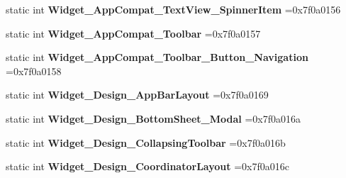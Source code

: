 \begin{DoxyCompactItemize}
\mbox{\label{classandroid_1_1support_1_1v7_1_1mediarouter_1_1R_1_1style_a760aa3fe92fab42e2c86dbb6703d8f70}} 
static int {\bfseries Widget\+\_\+\+App\+Compat\+\_\+\+Text\+View\+\_\+\+Spinner\+Item} =0x7f0a0156
\item 
\mbox{\label{classandroid_1_1support_1_1v7_1_1mediarouter_1_1R_1_1style_a77bfbfd8c74433fb8f81e9f8d7689d45}} 
static int {\bfseries Widget\+\_\+\+App\+Compat\+\_\+\+Toolbar} =0x7f0a0157
\item 
\mbox{\label{classandroid_1_1support_1_1v7_1_1mediarouter_1_1R_1_1style_ae57ab8ce7695ddef42e1ef2bc4b65c98}} 
static int {\bfseries Widget\+\_\+\+App\+Compat\+\_\+\+Toolbar\+\_\+\+Button\+\_\+\+Navigation} =0x7f0a0158
\item 
\mbox{\label{classandroid_1_1support_1_1v7_1_1mediarouter_1_1R_1_1style_a43d74f8165300ac78433e8a7fc3f5279}} 
static int {\bfseries Widget\+\_\+\+Design\+\_\+\+App\+Bar\+Layout} =0x7f0a0169
\item 
\mbox{\label{classandroid_1_1support_1_1v7_1_1mediarouter_1_1R_1_1style_ae1febea129e8f0acc5144138a6663241}} 
static int {\bfseries Widget\+\_\+\+Design\+\_\+\+Bottom\+Sheet\+\_\+\+Modal} =0x7f0a016a
\item 
\mbox{\label{classandroid_1_1support_1_1v7_1_1mediarouter_1_1R_1_1style_a3aaf7274721109ca1cef02be26068415}} 
static int {\bfseries Widget\+\_\+\+Design\+\_\+\+Collapsing\+Toolbar} =0x7f0a016b
\item 
\mbox{\label{classandroid_1_1support_1_1v7_1_1mediarouter_1_1R_1_1style_afb1507c60db34141fa97b452f034877e}} 
static int {\bfseries Widget\+\_\+\+Design\+\_\+\+Coordinator\+Layout} =0x7f0a016c
\item 
\mbox{\label{classandroid_1_1support_1_1v7_1_1mediarouter_1_1R_1_1style_ae6851b77960c12f700e7e63b778cb53f}} 

\end{DoxyCompactItemize}

